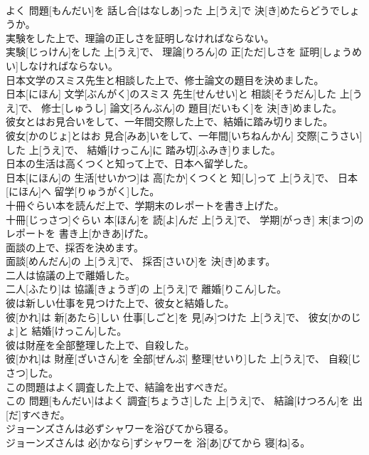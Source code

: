 \documentclass[8pt]{extreport}
\begin{document}
\begin{CJK}{UTF8}{min}
\\	よく 問題[もんだい]を 話し合[はなしあ]った 上[うえ]で 決[き]めたらどうでしょうか。
\\	実験をした上で、理論の正しさを証明しなければならない。	
\\	実験[じっけん]をした 上[うえ]で、 理論[りろん]の 正[ただ]しさを 証明[しょうめい]しなければならない。
\\	日本文学のスミス先生と相談した上で、修士論文の題目を決めました。	
\\	日本[にほん] 文学[ぶんがく]のスミス 先生[せんせい]と 相談[そうだん]した 上[うえ]で、 修士[しゅうし] 論文[ろんぶん]の 題目[だいもく]を 決[き]めました。
\\	彼女とはお見合いをして、一年間交際した上で、結婚に踏み切りました。	
\\	彼女[かのじょ]とはお 見合[みあ]いをして、一年間[いちねんかん] 交際[こうさい]した 上[うえ]で、 結婚[けっこん]に 踏み切[ふみき]りました。
\\	日本の生活は高くつくと知って上で、日本へ留学した。	
\\	日本[にほん]の 生活[せいかつ]は 高[たか]くつくと 知[し]って 上[うえ]で、 日本[にほん]へ 留学[りゅうがく]した。
\\	十冊ぐらい本を読んだ上で、学期末のレポートを書き上げた。	
\\	十冊[じっさつ]ぐらい 本[ほん]を 読[よ]んだ 上[うえ]で、 学期[がっき] 末[まつ]のレポートを 書き上[かきあ]げた。
\\	面談の上で、採否を決めます。	
\\	面談[めんだん]の 上[うえ]で、 採否[さいひ]を 決[き]めます。
\\	二人は協議の上で離婚した。	
\\	二人[ふたり]は 協議[きょうぎ]の 上[うえ]で 離婚[りこん]した。
\\	彼は新しい仕事を見つけた上で、彼女と結婚した。	
\\	彼[かれ]は 新[あたら]しい 仕事[しごと]を 見[み]つけた 上[うえ]で、 彼女[かのじょ]と 結婚[けっこん]した。
\\	彼は財産を全部整理した上で、自殺した。	
\\	彼[かれ]は 財産[ざいさん]を 全部[ぜんぶ] 整理[せいり]した 上[うえ]で、 自殺[じさつ]した。
\\	この問題はよく調査した上で、結論を出すべきだ。	
\\	この 問題[もんだい]はよく 調査[ちょうさ]した 上[うえ]で、 結論[けつろん]を 出[だ]すべきだ。
\\	ジョーンズさんは必ずシャワーを浴びてから寝る。	
\\	ジョーンズさんは 必[かなら]ずシャワーを 浴[あ]びてから 寝[ね]る。

\end{CJK}
\end{document}
